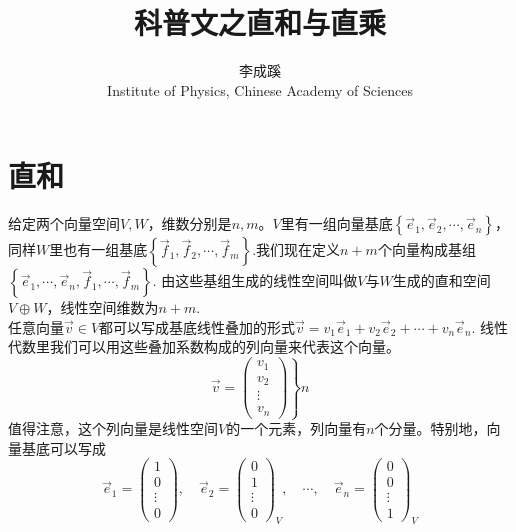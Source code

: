 \documentclass[a4paper,11pt]{article}
\begin{document}
    \title{科普文之直和与直乘}
    \author{李成蹊\\Institute of Physics, Chinese Academy of Sciences}
    \date{}
    \maketitle
    \section{直和}
    给定两个向量空间$V,W$，维数分别是$n,m$。$V$里有一组向量基底$\left\{\vec{e}_{1}, \vec{e}_{2}, \cdots, \vec{e}_{n}\right\}$，同样$W$里也有一组基底$\left\{\vec{f}_{1}, \vec{f}_{2}, \cdots, \vec{f}_{m}\right\}$.我们现在定义$n+m$个向量构成基组$\left\{\vec{e}_{1}, \cdots, \vec{e}_{n}, \vec{f}_{1}, \cdots, \vec{f}_{m}\right\}$. 由这些基组生成的线性空间叫做$V$与$W$生成的直和空间$V\oplus W$，线性空间维数为$n+m$.\\
    任意向量$\vec{v} \in V$都可以写成基底线性叠加的形式$\vec{v}=v_{1} \vec{e}_{1}+v_{2} \vec{e}_{2}+\cdots+v_{n} \vec{e}_{n}$. 线性代数里我们可以用这些叠加系数构成的列向量来代表这个向量。
    \begin{equation}
        \left.\vec{v}=\left(\begin{array}{c}
            v_{1} \\
            v_{2} \\
            \vdots \\
            v_{n}
            \end{array}\right)\right\} n
    \end{equation}
    值得注意，这个列向量是线性空间$V$的一个元素，列向量有$n$个分量。特别地，向量基底可以写成
    \begin{equation}
        \vec{e}_{1}=\left(\begin{array}{c}
            1 \\
            0 \\
            \vdots \\
            0
            \end{array}\right), \quad \vec{e}_{2}=\left(\begin{array}{c}
            0 \\
            1 \\
            \vdots \\
            0
            \end{array}\right)_{V}, \quad \cdots, \quad \vec{e}_{n}=\left(\begin{array}{c}
            0 \\
            0 \\
            \vdots \\
            1
            \end{array}\right)_{V}
    \end{equation}
\end{document}
